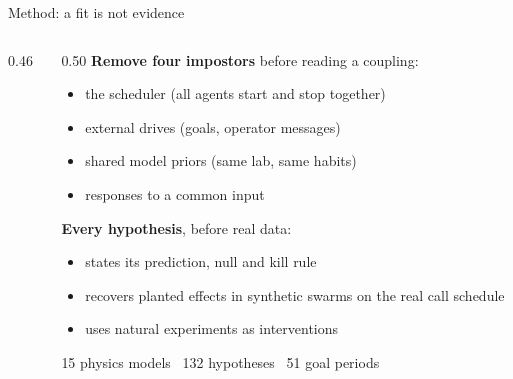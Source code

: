 \begin{frame}{Method: a fit is not evidence}
\begin{columns}[T,onlytextwidth]
\begin{column}{0.46\textwidth}
\centering\resizebox{!}{0.80\textheight}{}
\end{column}
\begin{column}{0.50\textwidth}
\small
\textbf{Remove four impostors} before reading a coupling:
\begin{itemize}\footnotesize
\item the scheduler (all agents start and stop together)
\item external drives (goals, operator messages)
\item shared model priors (same lab, same habits)
\item responses to a common input
\end{itemize}
\vspace{0.4em}
\textbf{Every hypothesis}, before real data:
\begin{itemize}\footnotesize
\item states its prediction, null and kill rule
\item recovers planted effects in synthetic swarms on the real call schedule
\item uses natural experiments as interventions
\end{itemize}
\vspace{0.4em}
{\footnotesize\color{ink2}15 physics models \textbullet\ 132 hypotheses \textbullet\ 51 goal periods}
\end{column}
\end{columns}
\end{frame}
